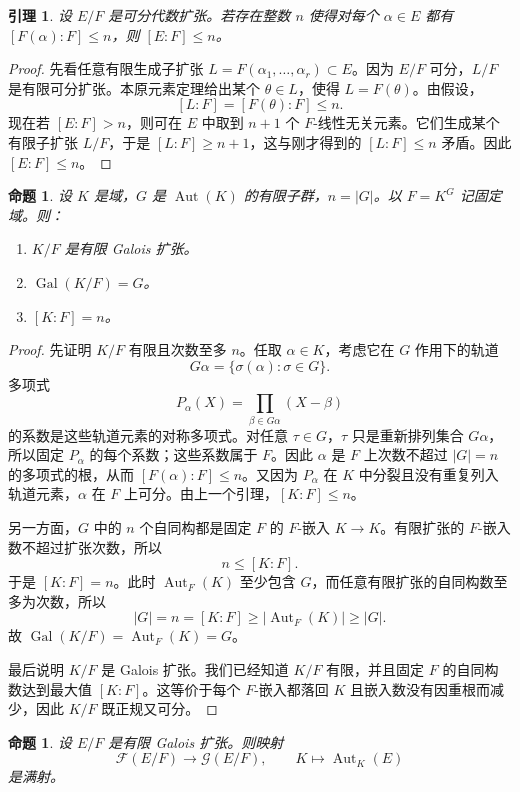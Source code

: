 \documentclass[11pt,a4paper,openany]{ctexbook}
\numberwithin{equation}{chapter}
\newcommand{\Gal}{\operatorname{Gal}}
\theoremstyle{plain}
\newtheorem{proposition}[theorem]{命题}
\newtheorem{lemma}[theorem]{引理}
\theoremstyle{definition}
\theoremstyle{remark}
\begin{document}
\begin{lemma}
设 $E/F$ 是可分代数扩张。若存在整数 $n$ 使得对每个 $\alpha\in E$ 都有 $[F(\alpha):F]\le n$，则 $[E:F]\le n$。
\end{lemma}

\begin{proof}
先看任意有限生成子扩张 $L=F(\alpha_1,\dots,\alpha_r)\subset E$。因为 $E/F$ 可分，$L/F$ 是有限可分扩张。本原元素定理给出某个 $\theta\in L$，使得 $L=F(\theta)$。由假设，
\[
[L:F]=[F(\theta):F]\le n.
\]
现在若 $[E:F]>n$，则可在 $E$ 中取到 $n+1$ 个 $F$-线性无关元素。它们生成某个有限子扩张 $L/F$，于是 $[L:F]\ge n+1$，这与刚才得到的 $[L:F]\le n$ 矛盾。因此 $[E:F]\le n$。
\end{proof}

\begin{proposition}
设 $K$ 是域，$G$ 是 $\operatorname{Aut}(K)$ 的有限子群，$n=|G|$。以 $F=K^G$ 记固定域。则：
\begin{enumerate}[label=(\arabic*)]
\item $K/F$ 是有限 Galois 扩张。
\item $\Gal(K/F)=G$。
\item $[K:F]=n$。
\end{enumerate}
\end{proposition}

\begin{proof}
先证明 $K/F$ 有限且次数至多 $n$。任取 $\alpha\in K$，考虑它在 $G$ 作用下的轨道
\[
G\alpha=\{\sigma(\alpha):\sigma\in G\}.
\]
多项式
\[
P_\alpha(X)=\prod_{\beta\in G\alpha}(X-\beta)
\]
的系数是这些轨道元素的对称多项式。对任意 $\tau\in G$，$\tau$ 只是重新排列集合 $G\alpha$，所以固定 $P_\alpha$ 的每个系数；这些系数属于 $F$。因此 $\alpha$ 是 $F$ 上次数不超过 $|G|=n$ 的多项式的根，从而 $[F(\alpha):F]\le n$。又因为 $P_\alpha$ 在 $K$ 中分裂且没有重复列入轨道元素，$\alpha$ 在 $F$ 上可分。由上一个引理，$[K:F]\le n$。

另一方面，$G$ 中的 $n$ 个自同构都是固定 $F$ 的 $F$-嵌入 $K\to K$。有限扩张的 $F$-嵌入数不超过扩张次数，所以
\[
n\le [K:F].
\]
于是 $[K:F]=n$。此时 $\operatorname{Aut}_F(K)$ 至少包含 $G$，而任意有限扩张的自同构数至多为次数，所以
\[
|G|=n=[K:F]\ge |\operatorname{Aut}_F(K)|\ge |G|.
\]
故 $\Gal(K/F)=\operatorname{Aut}_F(K)=G$。

最后说明 $K/F$ 是 Galois 扩张。我们已经知道 $K/F$ 有限，并且固定 $F$ 的自同构数达到最大值 $[K:F]$。这等价于每个 $F$-嵌入都落回 $K$ 且嵌入数没有因重根而减少，因此 $K/F$ 既正规又可分。
\end{proof}

\begin{proposition}
设 $E/F$ 是有限 Galois 扩张。则映射
\[
\mathcal F(E/F)\longrightarrow\mathcal G(E/F),\qquad
K\longmapsto\operatorname{Aut}_K(E)
\]
是满射。
\end{proposition}
\end{document}
